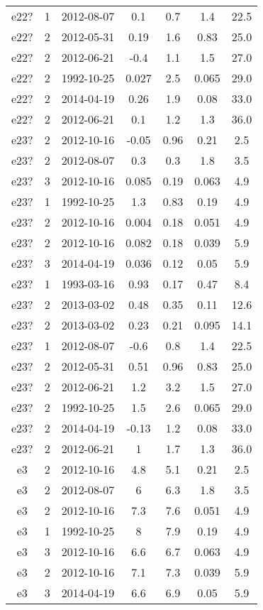 \begin{table*}[htp]
\begin{tabular}{ccccccc}
e22? & 1 & 2012-08-07 & 0.1 & 0.7 & 1.4 & 22.5 \\
e22? & 2 & 2012-05-31 & 0.19 & 1.6 & 0.83 & 25.0 \\
e22? & 2 & 2012-06-21 & -0.4 & 1.1 & 1.5 & 27.0 \\
e22? & 2 & 1992-10-25 & 0.027 & 2.5 & 0.065 & 29.0 \\
e22? & 2 & 2014-04-19 & 0.26 & 1.9 & 0.08 & 33.0 \\
e22? & 2 & 2012-06-21 & 0.1 & 1.2 & 1.3 & 36.0 \\
e23? & 2 & 2012-10-16 & -0.05 & 0.96 & 0.21 & 2.5 \\
e23? & 2 & 2012-08-07 & 0.3 & 0.3 & 1.8 & 3.5 \\
e23? & 3 & 2012-10-16 & 0.085 & 0.19 & 0.063 & 4.9 \\
e23? & 1 & 1992-10-25 & 1.3 & 0.83 & 0.19 & 4.9 \\
e23? & 2 & 2012-10-16 & 0.004 & 0.18 & 0.051 & 4.9 \\
e23? & 2 & 2012-10-16 & 0.082 & 0.18 & 0.039 & 5.9 \\
e23? & 3 & 2014-04-19 & 0.036 & 0.12 & 0.05 & 5.9 \\
e23? & 1 & 1993-03-16 & 0.93 & 0.17 & 0.47 & 8.4 \\
e23? & 2 & 2013-03-02 & 0.48 & 0.35 & 0.11 & 12.6 \\
e23? & 2 & 2013-03-02 & 0.23 & 0.21 & 0.095 & 14.1 \\
e23? & 1 & 2012-08-07 & -0.6 & 0.8 & 1.4 & 22.5 \\
e23? & 2 & 2012-05-31 & 0.51 & 0.96 & 0.83 & 25.0 \\
e23? & 2 & 2012-06-21 & 1.2 & 3.2 & 1.5 & 27.0 \\
e23? & 2 & 1992-10-25 & 1.5 & 2.6 & 0.065 & 29.0 \\
e23? & 2 & 2014-04-19 & -0.13 & 1.2 & 0.08 & 33.0 \\
e23? & 2 & 2012-06-21 & 1 & 1.7 & 1.3 & 36.0 \\
e3 & 2 & 2012-10-16 & 4.8 & 5.1 & 0.21 & 2.5 \\
e3 & 2 & 2012-08-07 & 6 & 6.3 & 1.8 & 3.5 \\
e3 & 2 & 2012-10-16 & 7.3 & 7.6 & 0.051 & 4.9 \\
e3 & 1 & 1992-10-25 & 8 & 7.9 & 0.19 & 4.9 \\
e3 & 3 & 2012-10-16 & 6.6 & 6.7 & 0.063 & 4.9 \\
e3 & 2 & 2012-10-16 & 7.1 & 7.3 & 0.039 & 5.9 \\
e3 & 3 & 2014-04-19 & 6.6 & 6.9 & 0.05 & 5.9 \\

\end{tabular}
\end{table*}
